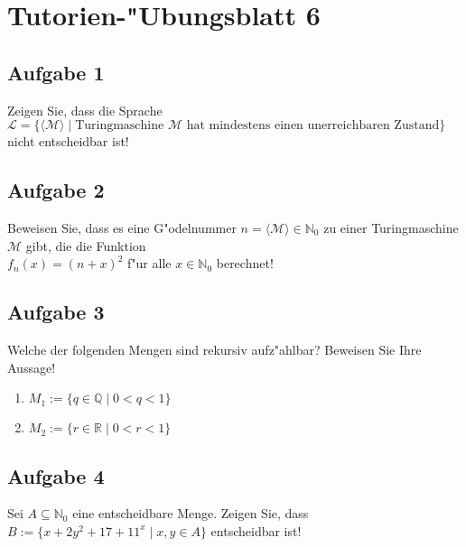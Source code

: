 \documentclass[10pt,oneside,onecolumn,a4paper,german,titlepage]{article}
\begin{document}
\section*{Tutorien-"Ubungsblatt 6}

\subsection*{Aufgabe 1}
Zeigen Sie, dass die Sprache $\mathcal{L} = \{\langle\mathcal{M}\rangle \; | \;
\mbox{Turingmaschine $\mathcal{M}$ hat mindestens einen unerreichbaren Zustand}\}$\\
nicht entscheidbar ist!

\subsection*{Aufgabe 2}
Beweisen Sie, dass es eine G"odelnummer $n = \langle\mathcal{M}\rangle \in
\mathbb{N}_0$ zu einer Turingmaschine $\mathcal{M}$ gibt, die die Funktion\\
$f_n(x) = (n+x)^2$ f"ur alle $x \in \mathbb{N}_0$ berechnet!

\subsection*{Aufgabe 3}
Welche der folgenden Mengen sind rekursiv aufz"ahlbar? Beweisen Sie Ihre Aussage!
\begin{enumerate}
\item $M_1 := \{q \in \mathbb{Q} \; | \; 0<q<1\}$
\item $M_2 := \{r \in \mathbb{R} \; | \; 0<r<1\}$
\end{enumerate}

\subsection*{Aufgabe 4}
Sei $A \subseteq \mathbb{N}_0$ eine entscheidbare Menge. Zeigen Sie, dass
$ B := \{x+2y^2+17+11^x \; | \; x,y \in A\}$ entscheidbar ist!
\end{document}
